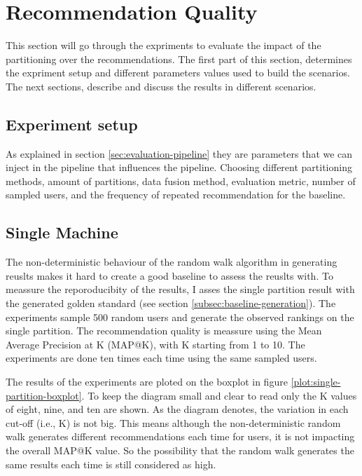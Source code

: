 \section{Recommendation Quality}
\label{sec:recommendation-quality}
This section will go through the expriments to evaluate the impact of the partitioning over the recommendations. The first part of this section, determines the expriment setup and different parameters values used to build the scenarios. The next sections, describe and discuss the results in different scenarios.


\subsection{Experiment setup}
\label{subsec:experiment-setup}
As explained in section \ref{sec:evaluation-pipeline} they are parameters that we can inject in the pipeline that influences the pipeline. Choosing different partitioning methods, amount of partitions, data fusion method, evaluation metric, number of sampled users, and the frequency of repeated recommendation for the baseline.


\subsection{Single Machine}
\label{subsec:eval-single-machine}
The non-deterministic behaviour of the random walk algorithm in generating reuslts makes it hard to create a good baseline to assess the reuslts with. To meassure the reporoducibity of the results, I asses the single partition result with the generated golden standard (see section \ref{subsec:baseline-generation}). The experiments sample 500 random users and generate the observed rankings on the single partition. The recommendation quality is meassure using the Mean Average Precision at K (MAP@K), with K starting from 1 to 10. The experiments are done ten times each time using the same sampled users. 

The results of the experiments are ploted on the boxplot in figure \ref{plot:single-partition-boxplot}. To keep the diagram small and clear to read only the K values of eight, nine, and ten are shown. As the diagram denotes, the variation in each cut-off (i.e., K) is not big. This means although the non-deterministic random walk generates different recommendations each time for users, it is not impacting the overall MAP@K value. So the possibility that the random walk generates the same results each time is still considered as high.


